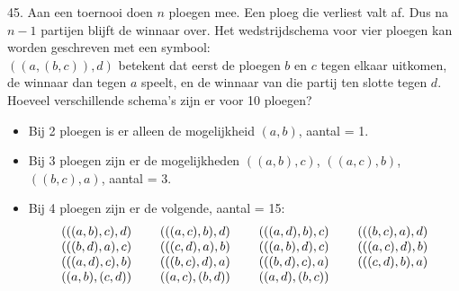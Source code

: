 \begin{problem}{45.}
	Aan een toernooi doen $n$ ploegen mee. Een ploeg die verliest valt af. Dus na $n-1$ partijen blijft de winnaar over. Het wedstrijdschema voor vier ploegen kan worden geschreven met een symbool:\\$((a,(b,c)),d)$ betekent dat eerst de ploegen $b$ en $c$ tegen elkaar uitko\-men, de winnaar dan tegen $a$ speelt, en de winnaar van die partij ten slotte tegen $d$. Hoeveel verschillende schema's zijn er voor 10 ploegen?
	\begin{itemize}
		\item Bij 2 ploegen is er alleen de mogelijkheid $(a,b)$, aantal = 1.
		\item Bij 3 ploegen zijn er de mogelijkheden $((a,b),c)$, $((a,c),b)$, $((b,c),a)$, aantal = 3.
		\item Bij 4 ploegen zijn er de volgende, aantal = 15:
			\begin{equation*}
				\begin{array}{@{}cccc@{}}
					(((a,b),c),d) & \quad\;(((a,c),b),d) & \quad\;(((a,d),b),c) & \quad\;(((b,c),a),d) \\
					(((b,d),a),c) & \quad\;(((c,d),a),b) & \quad\;(((a,b),d),c) & \quad\;(((a,c),d),b) \\
					(((a,d),c),b) & \quad\;(((b,c),d),a) & \quad\;(((b,d),c),a) & \quad\;(((c,d),b),a) \\
					((a,b),(c,d)) & \quad\;((a,c),(b,d)) & \quad\;((a,d),(b,c))
				\end{array}
			\end{equation*}
	\end{itemize}
\end{problem}

